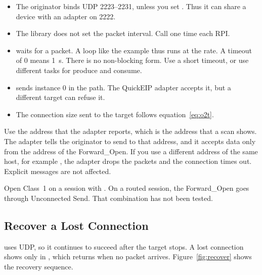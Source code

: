 \begin{itemize}
  \item The originator binds UDP 2223--2231, unless you set
        . Thus it can share a device with an adapter on 2222.
  \item The library does not set the packet interval. Call
         one time each RPI.
  \item {} waits for a packet. A loop like the example
        thus runs at the \TO{} rate. A timeout of 0 means 1~s. There is no
        non-blocking form. Use a short timeout, or use different tasks for
        produce and consume.
  \item {} sends instance 0 in the path. The QuickEIP
        adapter accepts it, but a different target can refuse it.
  \item The connection size sent to the target follows
        equation~\eqref{eq:o2t}.
\end{itemize}

\begin{caution}
Use the address that the adapter reports, which is the address that a scan
shows. The adapter tells the originator to send to that address, and it
accepts \OT{} data only from the address of the Forward\_Open. If you use a
different address of the same host, for example , the adapter
drops the packets and the connection times out. Explicit messages are not
affected.
\end{caution}

\begin{note}
\notelabel Open Class~1 on a session with . On a routed
session, the Forward\_Open goes through Unconnected Send. That combination has
not been tested.
\end{note}

\subsection{Recover a Lost Connection}\label{sec:recover}

 uses UDP, so it continues to succeed after the target
stops. A lost connection shows only in , which returns
 when no \TO{} packet arrives. Figure~\ref{fig:recover}
shows the recovery sequence.

